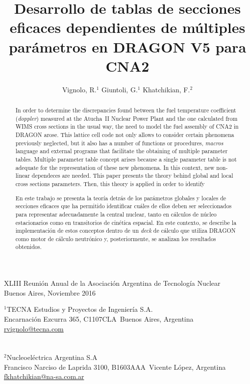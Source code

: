\documentclass[11pt]{article}
\makeatletter
\def\affiliation#1{\def\@affiliation{#1}}
\def\maketitle{%
\thispagestyle{empty}

\null
\vspace{0.5cm plus 0.5cm minus 0.5cm}

\begin{center}
\begin{minipage}{0.8\linewidth}
\begin{center}
\Large{\textbf{\textsc{\@title}}}

\vspace{0.75cm plus 0.2cm minus 0.1cm}

\large{\@author}

\vspace{1.25cm plus 0.25cm minus 0.25cm}

\small{\@affiliation}
\vspace{1cm plus 0.2cm minus 0.2cm}

\end{center}
\end{minipage}
\end{center}

}
\makeatother
\begin{document}
\vfill

\begin{center}
\begin{small}
XLIII Reunión Anual de la Asociación Argentina de Tecnología Nuclear\\
Buenos Aires, Noviembre 2016
\end{small}

\pagebreak

\title{Desarrollo de tablas de secciones eficaces dependientes de múltiples parámetros en DRAGON V5 para CNA2}
\author{Vignolo, R.$^{1}$ \quad Giuntoli, G.$^{1}$ \quad Khatchikian, F.$^{2}$}
\affiliation{%
$^1$TECNA Estudios y Proyectos de Ingeniería S.A.\\
Encarnaci\'on Ezcurra 365, C1107CLA~Buenos Aires, Argentina\\
\url{rvignolo@tecna.com}\\
~\\
~\\
$^2$Nucleoeléctrica Argentina S.A\\
Francisco Narciso de Laprida 3100, B1603AAA~Vicente López, Argentina\\
\url{fkhatchikian@na-sa.com.ar}\\
}


\maketitle

\begin{abstract}
\noindent
In order to determine the discrepancies found between the fuel temperature coefficient (\emph{doppler}) measured at the Atucha~II Nuclear Power Plant and the one calculated from WIMS cross sections in the usual way, the need to model the fuel assembly of CNA2 in DRAGON arose. This lattice cell code not only allows to consider certain phenomena previously neglected, but it also has a number of functions or procedures, \emph{macros} language and external programs that facilitate the obtaining of multiple parameter tables. Multiple parameter table concept arises because a single parameter table is not adequate for the representation of these new phenomena. In this context, new non-linear dependeces are needed. This paper presents the theory behind global and local cross sections parameters. Then, this theory is applied in order to identify

En este trabajo se presenta la teoría detrás de los parámetros globales y locales de secciones eficaces que ha permitido identificar cuáles de ellos deben ser seleccionados para representar adecuadamente la central nuclear, tanto en cálculos de núcleo estacionarios como en transitorios de cinética espacial. En este contexto, se describe la implementación de estos conceptos dentro de un \emph{deck} de cálculo que utiliza DRAGON como motor de cálculo neutrónico y, posteriormente, se analizan los resultados obtenidos.
\end{abstract}


\end{center}
\end{document}
